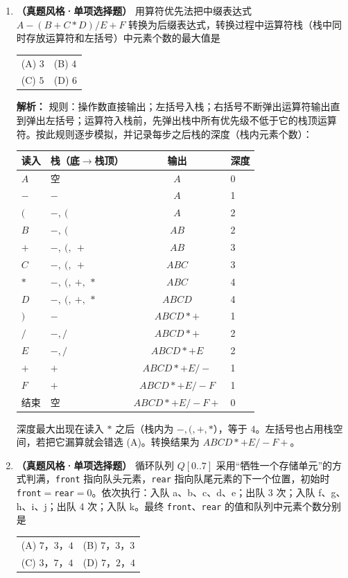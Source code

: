 \begin{enumerate}[resume]

\item \textbf{（真题风格·单项选择题）} 用算符优先法把中缀表达式 $A-(B+C*D)/E+F$ 转换为后缀表达式，转换过程中运算符栈（栈中同时存放运算符和左括号）中元素个数的最大值是
\begin{center}
\begin{tabular}{ll}
(A) $3$ & (B) $4$ \\[6pt]
(C) $5$ & (D) $6$
\end{tabular}
\end{center}

\ifshowsolutions\par\noindent\textbf{解析：} 规则：操作数直接输出；左括号入栈；右括号不断弹出运算符输出直到弹出左括号；运算符入栈前，先弹出栈中所有优先级不低于它的栈顶运算符。按此规则逐步模拟，并记录每步之后栈的深度（栈内元素个数）：
\begin{center}
\begin{tabular}{llcl}
\toprule
读入 & 栈（底$\to$栈顶） & 输出 & 深度 \\
\midrule
$A$ & 空 & $A$ & 0 \\
$-$ & $-$ & $A$ & 1 \\
$($ & $-,\ ($ & $A$ & 2 \\
$B$ & $-,\ ($ & $AB$ & 2 \\
$+$ & $-,\ (,\ +$ & $AB$ & 3 \\
$C$ & $-,\ (,\ +$ & $ABC$ & 3 \\
$*$ & $-,\ (,\ +,\ *$ & $ABC$ & 4 \\
$D$ & $-,\ (,\ +,\ *$ & $ABCD$ & 4 \\
$)$ & $-$ & $ABCD*+$ & 1 \\
$/$ & $-,/$ & $ABCD*+$ & 2 \\
$E$ & $-,/$ & $ABCD*+E$ & 2 \\
$+$ & $+$ & $ABCD*+E/-$ & 1 \\
$F$ & $+$ & $ABCD*+E/-F$ & 1 \\
结束 & 空 & $ABCD*+E/-F+$ & 0 \\
\bottomrule
\end{tabular}
\end{center}
深度最大出现在读入 $*$ 之后（栈内为 $-, (, +, *$），等于 $4$。左括号也占用栈空间，若把它漏算就会错选 (A)。转换结果为 $ABCD*+E/-F+$。
\par\noindent{}\else \answerarea[8] \fi

\item \textbf{（真题风格·单项选择题）} 循环队列 $Q[0..7]$ 采用“牺牲一个存储单元”的方式判满，\texttt{front} 指向队头元素，\texttt{rear} 指向队尾元素的下一个位置，初始时 \texttt{front}$=$\texttt{rear}$=0$。依次执行：入队 a、b、c、d、e；出队 3 次；入队 f、g、h、i、j；出队 4 次；入队 k。最终 \texttt{front}、\texttt{rear} 的值和队列中元素个数分别是
\begin{center}
\begin{tabular}{ll}
(A) $7$，$3$，$4$ & (B) $7$，$3$，$3$ \\[6pt]
(C) $3$，$7$，$4$ & (D) $7$，$2$，$4$
\end{tabular}
\end{center}


\end{enumerate}
